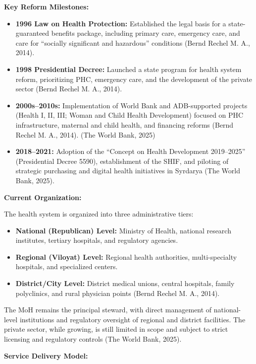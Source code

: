 \textbf{Key Reform Milestones:}

\begin{itemize}
\item
  \textbf{1996 Law on Health Protection:} Established the legal basis
  for a state-guaranteed benefits package, including primary care,
  emergency care, and care for ``socially significant and hazardous''
  conditions (Bernd Rechel M. A., 2014).
\item
  \textbf{1998 Presidential Decree:} Launched a state program for health
  system reform, prioritizing PHC, emergency care, and the development
  of the private sector (Bernd Rechel M. A., 2014).
\item
  \textbf{2000s--2010s:} Implementation of World Bank and ADB-supported
  projects (Health I, II, III; Woman and Child Health Development)
  focused on PHC infrastructure, maternal and child health, and
  financing reforms (Bernd Rechel M. A., 2014). (The World Bank, 2025)
\item
  \textbf{2018--2021:} Adoption of the ``Concept on Health Development
  2019--2025'' (Presidential Decree 5590), establishment of the SHIF,
  and piloting of strategic purchasing and digital health initiatives in
  Syrdarya (The World Bank, 2025).
\end{itemize}

\textbf{Current Organization:}

The health system is organized into three administrative tiers:

\begin{itemize}
\item
  \textbf{National (Republican) Level:} Ministry of Health, national
  research institutes, tertiary hospitals, and regulatory agencies.
\item
  \textbf{Regional (Viloyat) Level:} Regional health authorities,
  multi-specialty hospitals, and specialized centers.
\item
  \textbf{District/City Level:} District medical unions, central
  hospitals, family polyclinics, and rural physician points (Bernd
  Rechel M. A., 2014).
\end{itemize}

The MoH remains the principal steward, with direct management of
national-level institutions and regulatory oversight of regional and
district facilities. The private sector, while growing, is still limited
in scope and subject to strict licensing and regulatory controls (The
World Bank, 2025).

\textbf{Service Delivery Model:}

